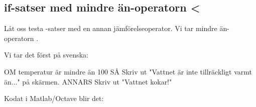 






\subsection{if-satser med mindre än-operatorn <}
Låt oss testa -satser med en annan jämförelseoperator. Vi tar mindre än-operatorn \cw{<}.

Vi tar det först på svenska:

\begin{pseudo}
OM temperatur är mindre än 100 SÅ
   Skriv ut "Vattnet är inte tillräckligt varmt än..." på skärmen.
ANNARS
   Skriv ut "Vattnet kokar!"
\end{pseudo}
\newpage
Kodat i Matlab/Octave blir det:

